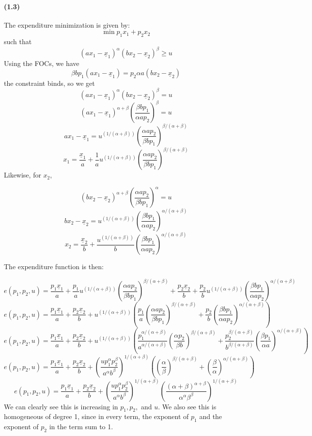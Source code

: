 \documentclass[10pt,letter]{article}
\begin{document}
\paragraph{(1.3)}
The expenditure minimization is given by:
\[ \min p_1 x_1 + p_2 x_2 \]
such that
\[ (ax_1 - \underline{x}_1)^\alpha(bx_2 - \underline{x}_2)^\beta \ge u \]
Using the FOCs, we have
\[ \beta b p_1(ax_1 - \underline{x}_1) = p_2 \alpha a (b x_2 - \underline{x}_2) \]
the constraint binds, so we get
\[ (ax_1 - \underline{x}_1)^\alpha(bx_2 - \underline{x}_2)^\beta = u \]
\[ (ax_1 - \underline{x}_1)^{\alpha+\beta} \left(\frac{\beta b p_1}{\alpha a p_2}\right)^\beta = u  \]
\[ ax_1 - \underline{x}_1  = u^{(1/(\alpha+\beta))} \left(\frac{\alpha a p_2}{\beta b p_1}\right)^{\beta/(\alpha+\beta)}\]
\[ x_1  = \frac{\underline{x}_1}{a} + \frac{1}{a}u^{(1/(\alpha+\beta))} \left(\frac{\alpha a p_2}{\beta b p_1}\right)^{\beta/(\alpha+\beta)}\]
Likewise, for $x_2$,

\[ (bx_2 - \underline{x}_2)^{\alpha+\beta} \left(\frac{\alpha a p_2}{\beta b p_1}\right)^\alpha = u  \]
\[ bx_2 - \underline{x}_2 = u^{(1/(\alpha+\beta))} \left(\frac{\beta b p_1}{\alpha a p_2}\right)^{\alpha/(\alpha + \beta)} \]
\[ x_2  = \frac{\underline{x}_2}{b} + \frac{u^{(1/(\alpha+\beta))}}{b} \left(\frac{\beta b p_1}{\alpha a p_2}\right)^{\alpha/(\alpha + \beta)} \]

The expenditure function is then:

\[ e(p_1, p_2, u) = \frac{p_1\underline{x}_1}{a} + \frac{p_1}{a}u^{(1/(\alpha+\beta))} \left(\frac{\alpha a p_2}{\beta b p_1}\right)^{\beta/(\alpha+\beta)} + \frac{p_2 \underline{x}_2}{b} + \frac{p_2}{b} u^{(1/(\alpha+\beta))}\left(\frac{\beta b p_1}{\alpha a p_2}\right)^{\alpha/(\alpha + \beta)} \]
\[ e(p_1, p_2, u) = \frac{p_1\underline{x}_1}{a}+ \frac{p_2 \underline{x}_2}{b} + u^{(1/(\alpha+\beta))} \left( \frac{p_1}{a} \left(\frac{\alpha a p_2}{\beta b p_1}\right)^{\beta/(\alpha+\beta)}  + \frac{p_2}{b}\left(\frac{\beta b p_1}{\alpha a p_2}\right)^{\alpha/(\alpha + \beta)} \right) \]
\[ e(p_1, p_2, u) = \frac{p_1\underline{x}_1}{a}+ \frac{p_2 \underline{x}_2}{b} + u^{(1/(\alpha+\beta))} \left( \frac{p_1^{\alpha/(\alpha+\beta)}}{a^{\alpha/(\alpha+\beta)}} \left(\frac{\alpha  p_2}{\beta b }\right)^{\beta/(\alpha+\beta)}  + \frac{p_2^{\beta/(\alpha+\beta)}}{b^{\beta/(\alpha+\beta)}}\left(\frac{\beta  p_1}{\alpha a}\right)^{\alpha/(\alpha + \beta)} \right) \]
\[ e(p_1, p_2, u) = \frac{p_1\underline{x}_1}{a}+ \frac{p_2 \underline{x}_2}{b} + \left( \frac{u p_1^{\alpha}p_2^{\beta}}{a^{\alpha}b^{\beta}} \right)^{1/(\alpha + \beta)} \left(  \left(\frac{\alpha }{\beta }\right)^{\beta/(\alpha+\beta)}  + \left(\frac{\beta }{\alpha}\right)^{\alpha/(\alpha + \beta)} \right) \]
\[ e(p_1, p_2, u) = \frac{p_1\underline{x}_1}{a}+ \frac{p_2 \underline{x}_2}{b} + \left( \frac{u p_1^{\alpha}p_2^{\beta}}{a^{\alpha}b^{\beta}} \right)^{1/(\alpha + \beta)} \left(  \frac{(\alpha + \beta)^{\alpha+\beta}}{\alpha^{\alpha}\beta^{\beta}} \right)^{1/(\alpha + \beta)} \]
We can clearly see this is increasing in $p_1, p_2,$ and $u$. We also see this is homogeneous of degree 1, since in every term, the exponent of $p_1$ and the exponent of $p_2$ in the term sum to 1.
\end{document}
